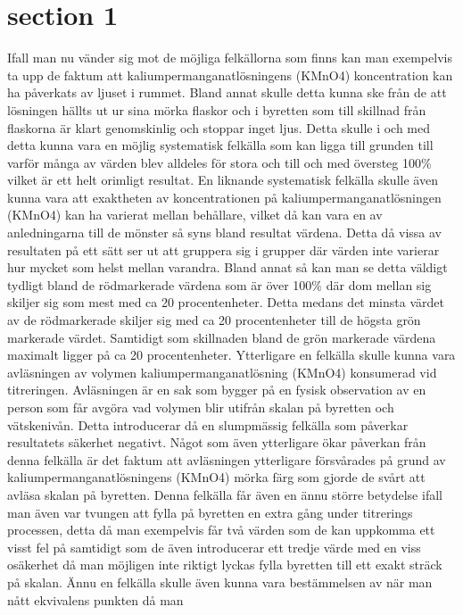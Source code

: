 
\section{section 1}
Ifall man nu vänder sig mot de möjliga felkällorna som finns kan man exempelvis ta upp de faktum
att kaliumpermanganatlösningens (KMnO4) koncentration kan ha påverkats av ljuset i rummet.
Bland annat skulle detta kunna ske från de att lösningen hällts ut ur sina mörka flaskor och i byretten
som till skillnad från flaskorna är klart genomskinlig och stoppar inget ljus. Detta skulle i och med
detta kunna vara en möjlig systematisk felkälla som kan ligga till grunden till varför många av
värden blev alldeles för stora och till och med översteg 100\% vilket är ett helt orimligt resultat.
En liknande systematisk felkälla skulle även kunna vara att exaktheten av koncentrationen på
kaliumpermanganatlösningen (KMnO4) kan ha varierat mellan behållare, vilket då kan vara en av
anledningarna till de mönster så syns bland resultat värdena. Detta då vissa av resultaten på ett sätt
ser ut att gruppera sig i grupper där värden inte varierar hur mycket som helst mellan varandra.
Bland annat så kan man se detta väldigt tydligt bland de rödmarkerade värdena som är över 100\%
där dom mellan sig skiljer sig som mest med ca 20 procentenheter. Detta medans det minsta värdet
av de rödmarkerade skiljer sig med ca 20 procentenheter till de högsta grön markerade värdet.
Samtidigt som skillnaden bland de grön markerade värdena maximalt ligger på ca 20 procentenheter.
Ytterligare en felkälla skulle kunna vara avläsningen av volymen kaliumpermanganatlösning
(KMnO4) konsumerad vid titreringen. Avläsningen är en sak som bygger på en fysisk observation av
en person som får avgöra vad volymen blir utifrån skalan på byretten och vätskenivån. Detta
introducerar då en slumpmässig felkälla som påverkar resultatets säkerhet negativt. Något som även
ytterligare ökar påverkan från denna felkälla är det faktum att avläsningen ytterligare försvårades på
grund av kaliumpermanganatlösningens (KMnO4) mörka färg som gjorde de svårt att avläsa skalan
på byretten. Denna felkälla får även en ännu större betydelse ifall man även var tvungen att fylla på
byretten en extra gång under titrerings processen, detta då man exempelvis får två värden som de kan
uppkomma ett visst fel på samtidigt som de även introducerar ett tredje värde med en viss osäkerhet
då man möjligen inte riktigt lyckas fylla byretten till ett exakt sträck på skalan.
Ännu en felkälla skulle även kunna vara bestämmelsen av när man nått ekvivalens punkten då man

